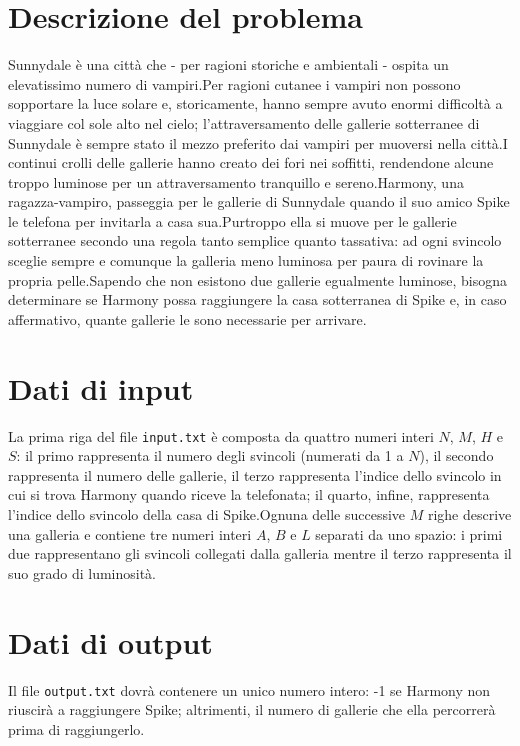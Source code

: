 \documentclass[a4paper,11pt]{article}
\begin{document}
\vspace{0.5cm}



\vspace{0.5cm}

\section*{Descrizione del problema}
  Sunnydale è una città che - per
ragioni storiche e ambientali - ospita un elevatissimo numero di
vampiri.Per ragioni cutanee i vampiri non possono sopportare la luce solare e,
storicamente, hanno sempre avuto enormi difficoltà a
viaggiare col sole alto nel cielo; l'attraversamento delle
gallerie sotterranee di Sunnydale è sempre stato
il mezzo preferito dai vampiri per muoversi nella città.I continui crolli delle gallerie hanno creato dei fori nei soffitti,
rendendone alcune troppo luminose per un attraversamento tranquillo e sereno.Harmony, una ragazza-vampiro, passeggia per le
gallerie di Sunnydale quando il suo amico Spike le telefona per invitarla a casa sua.Purtroppo ella si muove per le gallerie sotterranee
secondo una regola tanto semplice quanto tassativa: ad ogni svincolo
sceglie sempre e comunque la galleria meno luminosa per paura di rovinare la propria pelle.Sapendo che non esistono due gallerie egualmente luminose, bisogna determinare
se Harmony possa raggiungere la casa sotterranea di Spike e, in caso
affermativo, quante gallerie le sono necessarie per arrivare.

\section*{Dati di input}
  La prima riga del file \texttt{input.txt} è composta da
quattro numeri interi $N$, $M$, $H$ e
$S$: il primo rappresenta il numero degli svincoli
(numerati da 1 a $N$), il secondo rappresenta il numero delle
gallerie, il terzo rappresenta l'indice dello svincolo in
cui si trova Harmony quando riceve la telefonata; il quarto, infine, rappresenta l'indice
dello svincolo della casa di Spike.Ognuna delle successive $M$ righe descrive una galleria e
contiene tre numeri interi $A$, $B$ e
$L$ separati da uno spazio: i primi due rappresentano gli svincoli collegati dalla
galleria mentre il terzo rappresenta il suo grado di luminosità.

\section*{Dati di output}
  Il file \texttt{output.txt} dovrà contenere un
unico numero intero: -1 se Harmony non riuscirà a raggiungere
Spike; altrimenti, il numero di gallerie che ella percorrerà prima di
raggiungerlo.
\end{document}
